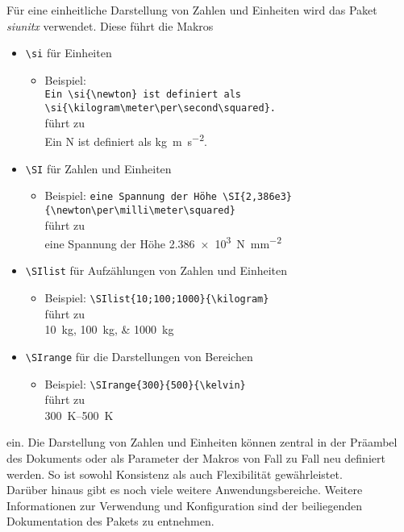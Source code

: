 Für eine einheitliche Darstellung von Zahlen und Einheiten wird das Paket \emph{siunitx} verwendet. Diese führt die Makros
\begin{itemize}
	\item \verb|\si| für Einheiten
		\begin{itemize}
			\item Beispiel:\\
			\verb|Ein \si{\newton} ist definiert als \si{\kilogram\meter\per\second\squared}.|\\
			führt zu\\
			Ein \si{\newton} ist definiert als \si{\kilogram\meter\per\second\squared}.
		\end{itemize}
	\item \verb|\SI| für Zahlen und Einheiten
		\begin{itemize}
			\item Beispiel: \verb|eine Spannung der Höhe \SI{2,386e3}{\newton\per\milli\meter\squared}|\\
			führt zu\\
			eine Spannung der Höhe \SI{2,386e3}{\newton\per\milli\meter\squared}
		\end{itemize}
	\item \verb|\SIlist| für Aufzählungen von Zahlen und Einheiten
		\begin{itemize}
			\item Beispiel: \verb|\SIlist{10;100;1000}{\kilogram}|\\
			führt zu\\
			\SIlist{10;100;1000}{\kilogram}
		\end{itemize}
	\item \verb|\SIrange| für die Darstellungen von Bereichen
		\begin{itemize}
			\item Beispiel: \verb|\SIrange{300}{500}{\kelvin}|\\
			führt zu\\
			\SIrange{300}{500}{\kelvin}
		\end{itemize}
\end{itemize}
ein. Die Darstellung von Zahlen und Einheiten können zentral in der Präambel des Dokuments oder als Parameter der Makros von Fall zu Fall neu definiert werden. So ist sowohl Konsistenz als auch Flexibilität gewährleistet.\\
Darüber hinaus gibt es noch viele weitere Anwendungsbereiche. Weitere Informationen zur Verwendung und Konfiguration sind der beiliegenden Dokumentation des Pakets zu entnehmen.